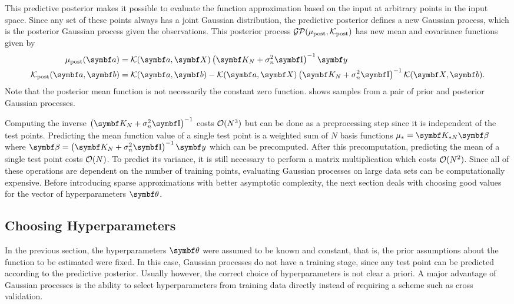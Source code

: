 This predictive posterior makes it possible to evaluate the function approximation based on the input at arbitrary points in the input space.
Since any set of these points always has a joint Gaussian distribution, the predictive posterior defines a new Gaussian process, which is the posterior Gaussian process given the observations.
This posterior process $\operatorname{\mathcal{GP}}(\mu_\text{post}, \operatorname{\mathcal{K}}_\text{post})$ has new mean and covariance functions given by
\begin{align}
    \begin{split}
        \mu_\text{post}(\mat{a}) &= \K(\mat{a}, \mat{X}) \left(\mat{K_N} + \sigma_n^2 \Eye \right)^{-1} \mat{y} \\
        \K_\text{post}(\mat{a}, \mat{b}) &= \K(\mat{a}, \mat{b}) - \K(\mat{a}, \mat{X}) \left( \mat{K_N} + \sigma_n^2 \Eye \right)^{-1} \K(\mat{X}, \mat{b}).
    \end{split}
\end{align}
Note that the posterior mean function is not necessarily the constant zero function.
 shows samples from a pair of prior and posterior Gaussian processes.

Computing the inverse $\left(\mat{K_N} + \sigma_n^2 \Eye \right)^{-1}$ costs $\operatorname{\mathcal{O}}(N^3)$ but can be done as a preprocessing step since it is independent of the test points.
Predicting the mean function value of a single test point is a weighted sum of $N$ basis functions $\mu_\ast = \mat{K_{\ast N}} \mat{\beta}$ where $\mat{\beta} = \left(\mat{K_N} + \sigma_n^2 \Eye \right)^{-1} \mat{y}$ which can be precomputed.
After this precomputation, predicting the mean of a single test point costs $\operatorname{\mathcal{O}}(N)$.
To predict its variance, it is still necessary to perform a matrix multiplication which costs $\operatorname{\mathcal{O}}(N^2)$.
Since all of these operations are dependent on the number of training points, evaluating Gaussian processes on large data sets can be computationally expensive.
Before introducing sparse approximations with better asymptotic complexity, the next section deals with choosing good values for the vector of hyperparameters $\mat{\theta}$.

\subsection{Choosing Hyperparameters}
In the previous section, the hyperparameters $\mat{\theta}$ were assumed to be known and constant, that is, the prior assumptions about the function to be estimated were fixed.
In this case, Gaussian processes do not have a training stage, since any test point can be predicted according to the predictive posterior.
Usually however, the correct choice of hyperparameters is not clear a priori.
A major advantage of Gaussian processes is the ability to select hyperparameters from training data directly instead of requiring a scheme such as cross validation.

